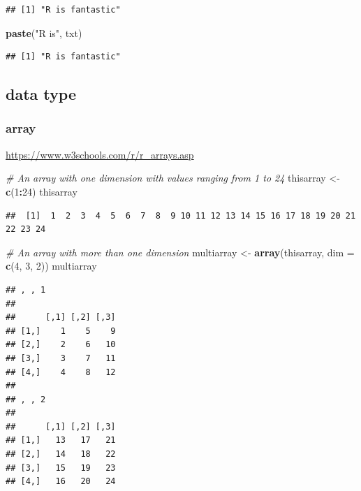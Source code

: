 \documentclass[
]{book}
\newenvironment{Shaded}{\begin{snugshade}}{\end{snugshade}}
\newcommand{\AttributeTok}[1]{\textcolor[rgb]{0.13,0.29,0.53}{#1}}
\newcommand{\CommentTok}[1]{\textcolor[rgb]{0.56,0.35,0.01}{\textit{#1}}}
\newcommand{\DecValTok}[1]{\textcolor[rgb]{0.00,0.00,0.81}{#1}}
\newcommand{\FunctionTok}[1]{\textcolor[rgb]{0.13,0.29,0.53}{\textbf{#1}}}
\newcommand{\NormalTok}[1]{#1}
\newcommand{\OtherTok}[1]{\textcolor[rgb]{0.56,0.35,0.01}{#1}}
\newcommand{\SpecialCharTok}[1]{\textcolor[rgb]{0.81,0.36,0.00}{\textbf{#1}}}
\newcommand{\StringTok}[1]{\textcolor[rgb]{0.31,0.60,0.02}{#1}}
\theoremstyle{definition}
\theoremstyle{definition}
\theoremstyle{definition}
\theoremstyle{definition}
\theoremstyle{remark}
\begin{document}
\begin{verbatim}
## [1] "R is fantastic"
\end{verbatim}

\begin{Shaded}
\begin{Highlighting}[]
\FunctionTok{paste}\NormalTok{(}\StringTok{"R is"}\NormalTok{, txt)}
\end{Highlighting}
\end{Shaded}

\begin{verbatim}
## [1] "R is fantastic"
\end{verbatim}

\subsection{data type}\label{data-type-1}

\subsubsection{array}\label{array}

\url{https://www.w3schools.com/r/r_arrays.asp}

\begin{Shaded}
\begin{Highlighting}[]
\CommentTok{\# An array with one dimension with values ranging from 1 to 24}
\NormalTok{thisarray }\OtherTok{\textless{}{-}} \FunctionTok{c}\NormalTok{(}\DecValTok{1}\SpecialCharTok{:}\DecValTok{24}\NormalTok{)}
\NormalTok{thisarray}
\end{Highlighting}
\end{Shaded}

\begin{verbatim}
##  [1]  1  2  3  4  5  6  7  8  9 10 11 12 13 14 15 16 17 18 19 20 21 22 23 24
\end{verbatim}

\begin{Shaded}
\begin{Highlighting}[]
\CommentTok{\# An array with more than one dimension}
\NormalTok{multiarray }\OtherTok{\textless{}{-}} \FunctionTok{array}\NormalTok{(thisarray, }\AttributeTok{dim =} \FunctionTok{c}\NormalTok{(}\DecValTok{4}\NormalTok{, }\DecValTok{3}\NormalTok{, }\DecValTok{2}\NormalTok{))}
\NormalTok{multiarray}
\end{Highlighting}
\end{Shaded}

\begin{verbatim}
## , , 1
## 
##      [,1] [,2] [,3]
## [1,]    1    5    9
## [2,]    2    6   10
## [3,]    3    7   11
## [4,]    4    8   12
## 
## , , 2
## 
##      [,1] [,2] [,3]
## [1,]   13   17   21
## [2,]   14   18   22
## [3,]   15   19   23
## [4,]   16   20   24
\end{verbatim}
\end{document}
